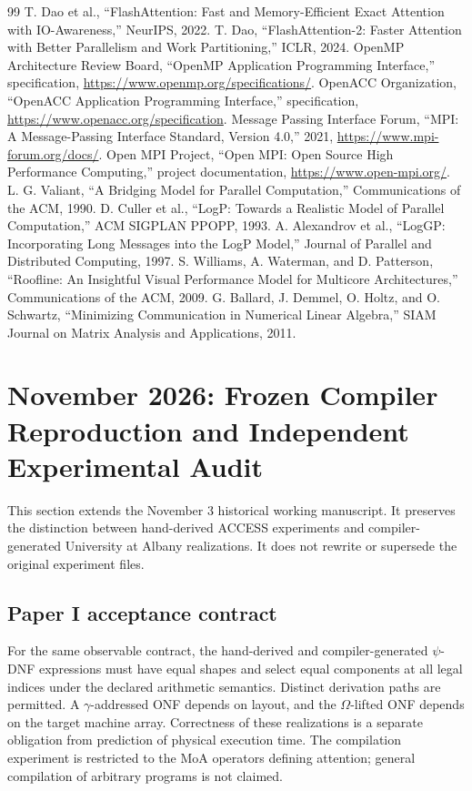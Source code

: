 \documentclass[11pt]{article}
\begin{document}
\begin{thebibliography}{99}
 T. Dao et al., ``FlashAttention: Fast and Memory-Efficient Exact Attention with IO-Awareness,'' NeurIPS, 2022.
 T. Dao, ``FlashAttention-2: Faster Attention with Better Parallelism and Work Partitioning,'' ICLR, 2024.
 OpenMP Architecture Review Board, ``OpenMP Application Programming Interface,'' specification, \url{https://www.openmp.org/specifications/}.
 OpenACC Organization, ``OpenACC Application Programming Interface,'' specification, \url{https://www.openacc.org/specification}.
 Message Passing Interface Forum, ``MPI: A Message-Passing Interface Standard, Version 4.0,'' 2021, \url{https://www.mpi-forum.org/docs/}.
 Open MPI Project, ``Open MPI: Open Source High Performance Computing,'' project documentation, \url{https://www.open-mpi.org/}.
 L. G. Valiant, ``A Bridging Model for Parallel Computation,'' Communications of the ACM, 1990.
 D. Culler et al., ``LogP: Towards a Realistic Model of Parallel Computation,'' ACM SIGPLAN PPOPP, 1993.
 A. Alexandrov et al., ``LogGP: Incorporating Long Messages into the LogP Model,'' Journal of Parallel and Distributed Computing, 1997.
 S. Williams, A. Waterman, and D. Patterson, ``Roofline: An Insightful Visual Performance Model for Multicore Architectures,'' Communications of the ACM, 2009.
 G. Ballard, J. Demmel, O. Holtz, and O. Schwartz, ``Minimizing Communication in Numerical Linear Algebra,'' SIAM Journal on Matrix Analysis and Applications, 2011.
\end{thebibliography}

\clearpage
\section{November 2026: Frozen Compiler Reproduction and Independent Experimental Audit}
\label{sec:nov2026evidence}
This section extends the November 3 historical working manuscript. It preserves the distinction between hand-derived ACCESS experiments and compiler-generated University at Albany realizations. It does not rewrite or supersede the original experiment files.

\subsection{Paper I acceptance contract}
For the same observable contract, the hand-derived and compiler-generated $\psi$-DNF expressions must have equal shapes and select equal components at all legal indices under the declared arithmetic semantics. Distinct derivation paths are permitted. A $\gamma$-addressed ONF depends on layout, and the $\Omega$-lifted ONF depends on the target machine array. Correctness of these realizations is a separate obligation from prediction of physical execution time. The compilation experiment is restricted to the MoA operators defining attention; general compilation of arbitrary programs is not claimed.
\end{document}
